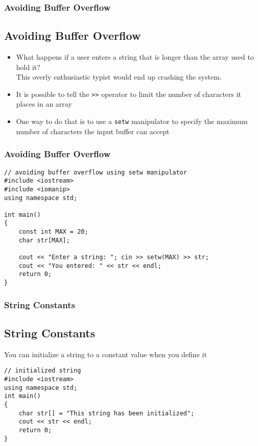 \documentclass{beamer}
\begin{document}
\begin{frame}\frametitle{Avoiding Buffer Overflow}
    \subsection{Avoiding Buffer Overflow} %
    \label{sub:avoiding_buffer_overflow}
    \begin{itemize}
        \item What happens if a user enters a string that is longer than the array used to hold it? \\
        This overly enthusiastic typist would end up crashing the system.
        \item It is possible to tell the \texttt{>>} operator to limit the number of characters it places in an array
        \item One way to do that is to use a \texttt{setw} manipulator to specify the maximum number of characters the input buffer can accept
    \end{itemize}
\end{frame}

\begin{frame}[fragile]\frametitle{Avoiding Buffer Overflow}
    \lstset{style=mystyle}
\begin{lstlisting}
// avoiding buffer overflow using setw manipulator
#include <iostream>
#include <iomanip>
using namespace std;

int main()
{
    const int MAX = 20;
    char str[MAX];

    cout << "Enter a string: "; cin >> setw(MAX) >> str;
    cout << "You entered: " << str << endl;
    return 0;
}
\end{lstlisting}
\end{frame}

\begin{frame}[fragile]\frametitle{String Constants}
    \subsection{String Constants} %
    \label{sub:string_constants}
    You can initialize a string to a constant value when you define it
    \lstset{style=mystyle}
\begin{lstlisting}
// initialized string
#include <iostream>
using namespace std;
int main()
{
    char str[] = "This string has been initialized";
    cout << str << endl;
    return 0;
}
\end{lstlisting}
\end{frame}
\end{document}

